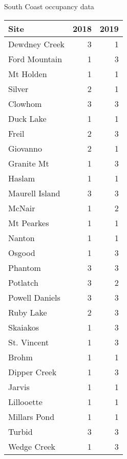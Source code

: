 \documentclass[]{article}
\begin{document}
\begin{capctable}

\caption{\label{tab:unnamed-chunk-10}South Coast occupancy data}
\centering
\begin{tabular}[t]{lrr}
\toprule
Site & 2018 &  2019\\
\midrule
\rowcolor{gray!6}  Dewdney Creek & 3 & 1\\
Ford Mountain & 1 & 3\\
\rowcolor{gray!6}  Mt Holden & 1 & 1\\
Silver & 2 & 1\\
\rowcolor{gray!6}  Clowhom & 3 & 3\\
\addlinespace
Duck Lake & 1 & 1\\
\rowcolor{gray!6}  Freil & 2 & 3\\
Giovanno & 2 & 1\\
\rowcolor{gray!6}  Granite Mt & 1 & 3\\
Haslam & 1 & 1\\
\addlinespace
\rowcolor{gray!6}  Maurell Island & 3 & 3\\
McNair & 1 & 2\\
\rowcolor{gray!6}  Mt Pearkes & 1 & 1\\
Nanton & 1 & 1\\
\rowcolor{gray!6}  Osgood & 1 & 3\\
\addlinespace
Phantom & 3 & 3\\
\rowcolor{gray!6}  Potlatch & 3 & 2\\
Powell Daniels & 3 & 3\\
\rowcolor{gray!6}  Ruby Lake & 2 & 3\\
Skaiakos & 1 & 3\\
\addlinespace
\rowcolor{gray!6}  St. Vincent & 1 & 3\\
Brohm & 1 & 1\\
\rowcolor{gray!6}  Dipper Creek & 1 & 3\\
Jarvis & 1 & 1\\
\rowcolor{gray!6}  Lillooette & 1 & 1\\
\addlinespace
Millars Pond & 1 & 1\\
\rowcolor{gray!6}  Turbid & 3 & 3\\
Wedge Creek & 1 & 3\\
\bottomrule
\end{tabular}
\end{capctable}
\end{document}
